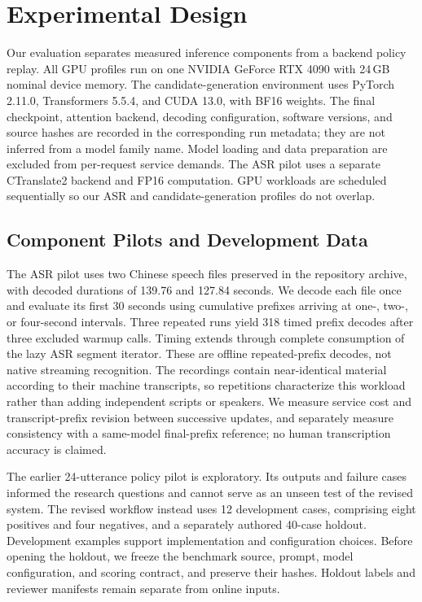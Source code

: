 \section{Experimental Design}
\label{sec:experimental-design}

Our evaluation separates measured inference components from a backend
policy replay. All GPU profiles run on one NVIDIA GeForce RTX 4090 with
24\,GB nominal device memory. The candidate-generation environment uses
PyTorch 2.11.0, Transformers 5.5.4, and CUDA 13.0, with BF16 weights.
The final checkpoint, attention backend, decoding configuration, software
versions, and source hashes are recorded in the corresponding run metadata;
they are not inferred from a model family name. Model loading and data
preparation are excluded from per-request service demands. The ASR pilot
uses a separate CTranslate2 backend and FP16 computation. GPU workloads
are scheduled sequentially so our ASR and candidate-generation profiles
do not overlap.

\subsection{Component Pilots and Development Data}

The ASR pilot uses two Chinese speech files preserved in the repository
archive, with decoded durations of 139.76 and 127.84 seconds. We decode
each file once and evaluate its first 30 seconds using cumulative
prefixes arriving at one-, two-, or four-second intervals. Three repeated
runs yield 318 timed prefix decodes after three excluded warmup calls.
Timing extends through complete consumption of the lazy ASR segment
iterator. These are offline repeated-prefix decodes, not native streaming
recognition. The recordings contain near-identical material according
to their machine transcripts, so repetitions characterize this workload
rather than adding independent scripts or speakers. We measure service
cost and transcript-prefix revision between successive updates, and
separately measure consistency with a same-model final-prefix reference;
no human transcription accuracy is claimed.

The earlier 24-utterance policy pilot is exploratory. Its outputs and
failure cases informed the research questions and cannot serve as an
unseen test of the revised system. The revised workflow instead uses
12 development cases, comprising eight positives and four negatives,
and a separately authored 40-case holdout. Development examples support
implementation and configuration choices. Before opening the holdout,
we freeze the benchmark source, prompt, model configuration, and scoring
contract, and preserve their hashes. Holdout labels and reviewer
manifests remain separate from online inputs.

